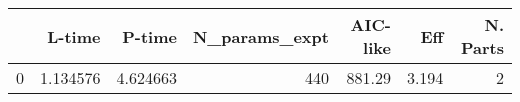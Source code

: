 \begin{tabular}{lrrrrrr}
\toprule
{} &    L-time &    P-time &  N\_params\_expt &  AIC-like &    Eff &  N. Parts \\
\midrule
0 &  1.134576 &  4.624663 &            440 &    881.29 &  3.194 &         2 \\
\bottomrule
\end{tabular}

